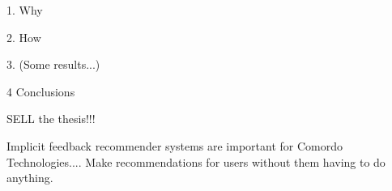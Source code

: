 



1. Why

2. How

3. (Some results...)

4 Conclusions

SELL the thesis!!!

Implicit feedback recommender systems are important for Comordo Technologies.... Make recommendations for users without them having to do anything.
